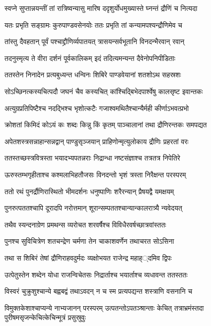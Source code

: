 \twolineshloka
{स्वप्ने सुप्तान्नयन्तीं तां रात्रिष्वन्यासु मारिष}
{ददृशुर्योधमुख्यास्ते घ्नन्तं द्रौणिं च नित्यदा}


\twolineshloka
{यतः प्रभृति सङ्ग्रामः कुरुपाण्डवसेनयोः}
{ततः प्रभृति तां कन्यामपश्यन्द्रौणिमेव च}


\twolineshloka
{तांस्तु दैवहतान् पूर्वं पश्चाद्द्रौणिर्व्यपातयत्}
{त्रासयन्सर्वभूतानि विनदन्भैरवान् रवान्}


\twolineshloka
{तदनुस्मृत्य ते वीरा दर्शनं पूर्वकालिकम्}
{इदं तदित्यमन्यन्त दैवेनोपनिपीडिताः}


\twolineshloka
{ततस्तेन निनादेन प्रत्यबुध्यन्त धन्विनः}
{शिबिरे पाण्डवेयानां शतशोऽथ सहस्रशः}


\twolineshloka
{सोऽच्छिनत्कस्यचित्पदौ जघनं चैव कस्यचित्}
{कांश्चिद्बिभेदपार्श्वेषु कालसृष्ट इवान्तकः}


\twolineshloka
{अत्युग्रप्रतिपिष्टैश्च नदद्भिश्च भृशोत्कटैः}
{गजाश्वमथितैश्चान्यैर्मही कीर्णाऽभवत्प्रभो}


\twolineshloka
{क्रोशतां किमिदं कोऽयं कः शब्दः किन्नु किं कृतम्}
{पाञ्चालानां तथा द्रौणिरन्तकः समपद्यत}


\twolineshloka
{अपेतशस्त्रसन्नाहान्सन्नद्वान् पाण्डुसृञ्जयान्}
{प्राहिणोन्मृत्युलोकाय द्रौणिः प्रहरतां वरः}


\twolineshloka
{ततस्तच्छस्त्रवित्रस्ता भयादभ्यपतन्नराः}
{निद्रान्धा नष्टसंज्ञाश्च तत्रतत्र निपेतिरे}


\twolineshloka
{ऊरुस्तम्भगृहीताश्च कश्मलाभिहतौजसः}
{विनदन्तो भृशं त्रस्ता निरैक्षन्त परस्परम्}


\twolineshloka
{ततो रथं पुनर्द्रौणिरास्थितो भीमदर्शनः}
{धनुष्पाणिः शरैरन्यान् प्रैषयद्वै यमक्षयम्}


\twolineshloka
{पुनरुत्पततश्चापि दूरादपि नरोत्तमान्}
{शूरान्सम्पततश्चान्यान्कालरात्र्यै न्यवेदयत्}


\twolineshloka
{तथैव स्यन्दनाग्रेण प्रमथन्स व्यरोचत}
{शरवर्षैश्च विविधैरवर्षच्छात्रवांस्ततः}


\twolineshloka
{पुनश्च सुविचित्रेण शतचन्द्रेण चर्मणा}
{तेन चाकाशवर्णेन तथाचरत सोऽसिना}


\twolineshloka
{तथा स शिबिरं तेषां द्रौणिराहवदुर्मदः}
{व्यक्षोभयत राजेन्द्र महाह््दमिव द्विपः}


\twolineshloka
{उत्पेतुस्तेन शब्देन योधा राजन्विचेतसः}
{निद्रार्ताश्च भयार्ताश्च व्यधावन्त ततस्ततः}


\twolineshloka
{विस्वरं चुक्रुशुश्चान्ये बह्वबद्वं तथाऽवदन्}
{न च स्म प्रत्यपद्यन्त शस्त्राणि वसनानि च}


\threelineshloka
{विमुक्तकेशाश्चाप्यन्ये नाभ्यजानन् परस्परम्}
{उत्पतन्तोऽपतञ्श्रान्ताः केचित् तत्राभ्रमंस्तदा}
{पुरीषमसृजन्केचित्केचिन्मूत्रं प्रसुस्रुवुः}


